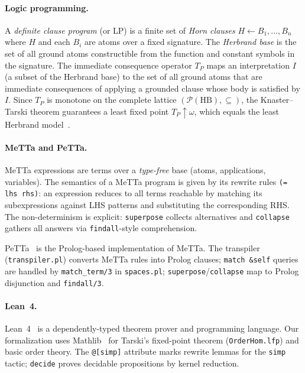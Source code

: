 \documentclass[]{article}
\newcommand{\code}[1]{\texttt{#1}}
\newcommand{\MeTTa}{\textup{MeTTa}}
\newcommand{\PeTTa}{\textup{PeTTa}}
\begin{document}
\paragraph{Logic programming.}
A \emph{definite clause program} (or LP) is a finite set of \emph{Horn clauses}
$H \leftarrow B_1, \ldots, B_n$ where $H$ and each $B_i$ are atoms over a fixed
signature.  The \emph{Herbrand base} is the set of all ground atoms constructible
from the function and constant symbols in the signature.  The immediate consequence
operator $T_P$ maps an interpretation $I$ (a subset of the Herbrand base) to the
set of all ground atoms that are immediate consequences of applying a grounded
clause whose body is satisfied by $I$.  Since $T_P$ is monotone on the complete
lattice $(\mathcal{P}(\text{HB}), \subseteq)$, the Knaster--Tarski theorem
guarantees a least fixed point $T_P \uparrow \omega$, which equals the least
Herbrand model~\cite{vanEmdenKowalski1976,Lloyd1987}.

\paragraph{\MeTTa{} and \PeTTa{}.}
\MeTTa{} expressions are terms over a \emph{type-free} base (atoms, applications,
variables).  The semantics of a \MeTTa{} program is given by its rewrite rules
\code{(= lhs rhs)}: an expression reduces to all terms reachable by matching
its subexpressions against LHS patterns and substituting the corresponding RHS.
The non-determinism is explicit: \code{superpose} collects alternatives and
\code{collapse} gathers all answers via \code{findall}-style comprehension.

\PeTTa{}~\cite{petta2024} is the Prolog-based implementation of \MeTTa{}.
The transpiler (\code{transpiler.pl}) converts \MeTTa{} rules into Prolog clauses;
\code{match \&self} queries are handled by \code{match\_term/3} in \code{spaces.pl};
\code{superpose}/\code{collapse} map to Prolog disjunction and \code{findall/3}.

\paragraph{Lean~4.}
Lean~4~\cite{Moura2021} is a dependently-typed theorem prover and programming
language.  Our formalization uses Mathlib~\cite{mathlib2020} for Tarski's fixed-point
theorem (\code{OrderHom.lfp}) and basic order theory.  The \code{@[simp]} attribute
marks rewrite lemmas for the \code{simp} tactic; \code{decide} proves decidable
propositions by kernel reduction.
\end{document}
